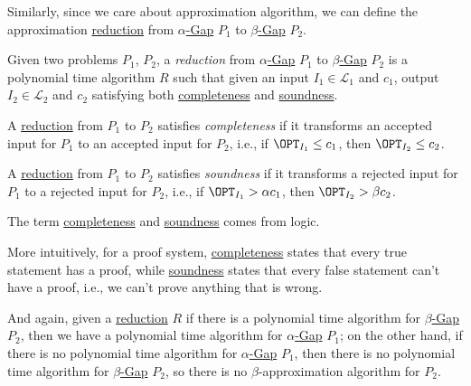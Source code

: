 Similarly, since we care about approximation algorithm, we can define the approximation \hyperref[def:reduction]{reduction} from \hyperref[def:Gap]{\(\alpha \)-Gap} \(P_1\) to \hyperref[def:Gap]{\(\beta \)-Gap} \(P_2\).

\begin{definition}[Reduction]\label{def:reduction}
	Given two problems \(P_1\), \(P_2\), a \emph{reduction} from \hyperref[def:Gap]{\(\alpha \)-Gap} \(P_1\) to \hyperref[def:Gap]{\(\beta \)-Gap} \(P_2\) is a polynomial time algorithm \(R\) such that given an input \(I_1\in \mathcal{L}_1 \) and \(c_1\), output \(I_2\in \mathcal{L} _2\) and \(c_2\) satisfying both \hyperref[def:completeness]{completeness} and \hyperref[def:soundness]{soundness}.
	\begin{definition}[Completeness]\label{def:completeness}
		A \hyperref[def:reduction]{reduction} from \(P_1\) to \(P_2\) satisfies \emph{completeness} if it transforms an accepted input for \(P_1\) to an accepted input for \(P_2\), i.e., if \(\OPT_{I_1}\leq c_1\), then \(\OPT_{I_2}\leq c_2\).
	\end{definition}
	\begin{definition}[Soundness]\label{def:soundness}
		A \hyperref[def:reduction]{reduction} from \(P_1\) to \(P_2\) satisfies \emph{soundness} if it transforms a rejected input for \(P_1\) to a rejected input for \(P_2\), i.e., if \(\OPT_{I_1}> \alpha c_1\), then \(\OPT_{I_2}> \beta c_2\).
	\end{definition}
\end{definition}

\begin{remark}
	The term \hyperref[def:completeness]{completeness} and \hyperref[def:soundness]{soundness} comes from logic.
\end{remark}
\begin{explanation}
	More intuitively, for a proof system, \hyperref[def:completeness]{completeness} states that every true statement has a proof, while \hyperref[def:soundness]{soundness} states that every false statement can't have a proof, i.e., we can't prove anything that is wrong.
\end{explanation}

And again, given a \hyperref[def:reduction]{reduction} \(R\) if there is a polynomial time algorithm for \hyperref[def:Gap]{\(\beta \)-Gap} \(P_2\), then we have a polynomial time algorithm for \hyperref[def:Gap]{\(\alpha \)-Gap} \(P_1\); on the other hand, if there is no polynomial time algorithm for \hyperref[def:Gap]{\(\alpha \)-Gap} \(P_1\), then there is no polynomial time algorithm for \hyperref[def:Gap]{\(\beta \)-Gap} \(P_2\), so there is no \(\beta \)-approximation algorithm for \(P_2\).

